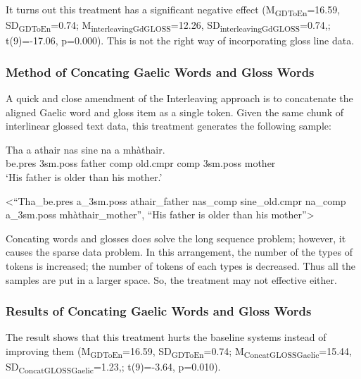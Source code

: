 \documentclass[11pt,a4paper]{article}
\begin{document}

It turns out this treatment has a significant negative effect
(M\textsubscript{GDToEn}=16.59, SD\textsubscript{GDToEn}=0.74; M\textsubscript{interleavingGdGLOSS}=12.26, SD\textsubscript{interleavingGdGLOSS}=0.74,; t(9)=-17.06, p=0.000). This is not the right way of incorporating gloss line data. 


\subsubsection{Method of Concating Gaelic Words and Gloss Words }\label{treatment:Concating}
A quick and close amendment of the Interleaving approach is to concatenate the aligned Gaelic word and gloss item as a single token. Given the same chunk of interlinear glossed text data, this treatment generates the following sample:

\begin{exe} 
\ex 
	\begin{xlist}
	\ex 
		\gll	 Tha a athair nas sine na a mh\`athair.\\  
     		     be.pres 3sm.poss father comp old.cmpr comp 3sm.poss mother \\
    	\glt    `His father is older than his mother.'  

    \ex <``Tha\_be.pres a\_3sm.poss athair\_father nas\_comp sine\_old.cmpr na\_comp a\_3sm.poss mh\`athair\_mother'', ``His father is older than his mother''>
    \end{xlist}
\end{exe}

Concating words and glosses does solve the long sequence problem; however, it causes the sparse data problem. In this arrangement, the number of the types of tokens is increased; the number of tokens of each types is decreased. Thus all the samples are put in a larger space. So, the treatment may not effective either. 

\subsubsection{Results of Concating Gaelic Words and Gloss Words}

The result shows that this treatment hurts the baseline systems instead of improving them (M\textsubscript{GDToEn}=16.59, SD\textsubscript{GDToEn}=0.74; M\textsubscript{ConcatGLOSSGaelic}=15.44, SD\textsubscript{ConcatGLOSSGaelic}=1.23,; t(9)=-3.64, p=0.010).
\end{document}
